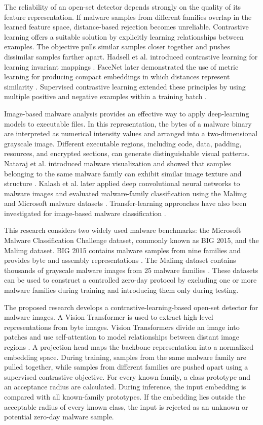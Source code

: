 \documentclass[12pt,a4paper]{article}
\begin{document}
The reliability of an open-set detector depends strongly on the quality of its feature representation. If malware samples from different families overlap in the learned feature space, distance-based rejection becomes unreliable. Contrastive learning offers a suitable solution by explicitly learning relationships between examples. The objective pulls similar samples closer together and pushes dissimilar samples farther apart. Hadsell et al. introduced contrastive learning for learning invariant mappings \citep{hadsell2006}. FaceNet later demonstrated the use of metric learning for producing compact embeddings in which distances represent similarity \citep{schroff2015}. Supervised contrastive learning extended these principles by using multiple positive and negative examples within a training batch \citep{khosla2020}.

Image-based malware analysis provides an effective way to apply deep-learning models to executable files. In this representation, the bytes of a malware binary are interpreted as numerical intensity values and arranged into a two-dimensional grayscale image. Different executable regions, including code, data, padding, resources, and encrypted sections, can generate distinguishable visual patterns. Nataraj et al. introduced malware visualization and showed that samples belonging to the same malware family can exhibit similar image texture and structure \citep{nataraj2011}. Kalash et al. later applied deep convolutional neural networks to malware images and evaluated malware-family classification using the Malimg and Microsoft malware datasets \citep{kalash2018}. Transfer-learning approaches have also been investigated for image-based malware classification \citep{bhodia2019}.

This research considers two widely used malware benchmarks: the Microsoft Malware Classification Challenge dataset, commonly known as BIG 2015, and the Malimg dataset. BIG 2015 contains malware samples from nine families and provides byte and assembly representations \citep{microsoft2015}. The Malimg dataset contains thousands of grayscale malware images from 25 malware families \citep{nataraj2011}. These datasets can be used to construct a controlled zero-day protocol by excluding one or more malware families during training and introducing them only during testing.

The proposed research develops a contrastive-learning-based open-set detector for malware images. A Vision Transformer is used to extract high-level representations from byte images. Vision Transformers divide an image into patches and use self-attention to model relationships between distant image regions \citep{dosovitskiy2020}. A projection head maps the backbone representation into a normalized embedding space. During training, samples from the same malware family are pulled together, while samples from different families are pushed apart using a supervised contrastive objective. For every known family, a class prototype and an acceptance radius are calculated. During inference, the input embedding is compared with all known-family prototypes. If the embedding lies outside the acceptable radius of every known class, the input is rejected as an unknown or potential zero-day malware sample.
\end{document}
